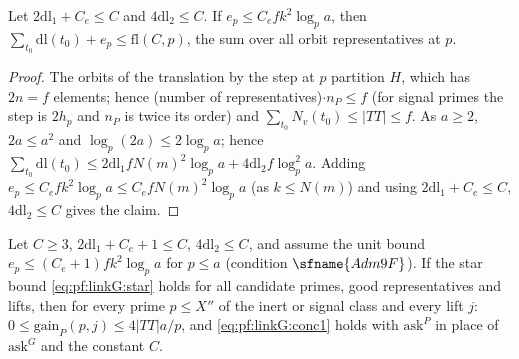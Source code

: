 \begin{lemma}\label{pf:linkG:losses}
Let $2\mathrm{dl}_1+C_e\le C$ and $4\mathrm{dl}_2\le C$. If $e_p\le C_efk^2\log_pa$, then
$\sum_{t_0}\mathrm{dl}(t_0)+e_p\le\mathrm{fl}(C,p)$, the sum over all orbit representatives at $p$.
\end{lemma}

\begin{proof}
The orbits of the translation by the step at $p$ partition $H$, which has $2n=f$ elements; hence (number of
representatives)$\cdot n_P\le f$ (for signal primes the step is $2h_p$ and $n_P$ is twice its order) and $\sum_{t_0}N_v(t_0)\le|TT|\le
f$. As $a\ge2$, $2a\le a^2$ and $\log_p(2a)\le2\log_pa$; hence
$\sum_{t_0}\mathrm{dl}(t_0)\le2\mathrm{dl}_1fN(m)^2\log_pa+4\mathrm{dl}_2f\log_p^2a$. Adding $e_p\le C_efk^2\log_pa\le C_efN(m)^2\log_pa$
(as $k\le N(m)$) and using $2\mathrm{dl}_1+C_e\le C$, $4\mathrm{dl}_2\le C$ gives the claim.
\end{proof}

\begin{proposition}\label{pf:linkG:gainstar}
Let $C\ge3$, $2\mathrm{dl}_1+C_e+1\le C$, $4\mathrm{dl}_2\le C$, and assume the unit bound $e_p\le(C_e+1)fk^2\log_pa$ for $p\le a$
(condition $\sfname{Adm9F}$). If the star bound \eqref{eq:pf:linkG:star} holds for all candidate primes, good representatives and
lifts, then for every prime $p\le X''$ of the inert or signal class and every lift $j$: $0\le\mathrm{gain}_P(p,j)\le4|TT|a/p$, and
\eqref{eq:pf:linkG:conc1} holds with $\mathrm{ask}^P$ in place of $\mathrm{ask}^G$ and the constant $C$.
\end{proposition}

